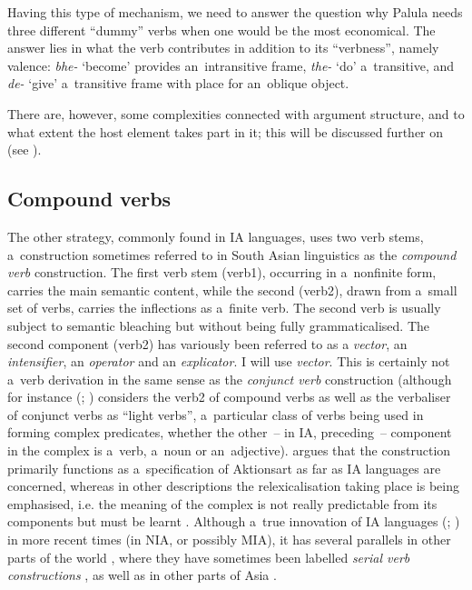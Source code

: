 Having this type of mechanism, we need to answer the question why Palula needs three different ``dummy'' verbs when one would be the most economical. The answer lies in what the verb contributes in addition to its ``verbness'', namely valence: \textit{bhe-} `become' provides an~intransitive frame, \textit{the-} `do' a~transitive, and \textit{de-} `give' a~transitive frame with place for an~oblique object. 


There are, however, some complexities connected with argument structure, and to what extent the host element takes part in it; this will be discussed further on (see ).


\subsection{Compound verbs}
\label{subsec:8-6-2}

The other strategy, commonly found in IA languages, uses two verb stems, a~construction sometimes referred to in South Asian linguistics \citep[326]{masica1991} as the \textit{compound verb} construction. The first verb stem (verb\textsc{1}), occurring in a~nonfinite form, carries the main semantic content, while the second (verb\textsc{2}), drawn from a~small set of verbs, carries the inflections as a~finite verb. The second verb is usually subject to semantic bleaching but without being fully grammaticalised. The second component (verb2) has variously been referred to as a \textit{vector}, an \textit{intensifier}, an \textit{operator} and an \textit{explicator}. I will use \textit{vector}. This is certainly not a~verb derivation in the same sense as the \textit{conjunct verb} construction (although for instance \citeauthor{butt1993} (\citeyear[31]{butt1993}; \citeyear{butt2003}) considers the verb2 of compound verbs as well as the verbaliser of conjunct verbs as ``light verbs'', a~particular class of verbs being used in forming complex predicates, whether the other~-- in IA, preceding~-- component in the complex is a~verb, a~noun or an~adjective). \citet[326--330]{masica1991} argues that the construction primarily functions as a~specification of Aktionsart as far as IA languages are concerned, whereas in other descriptions the relexicalisation taking place is being emphasised, i.e. the meaning of the complex is not really predictable from its components but must be learnt \citep[143]{schmidt1999}. Although a~true innovation of IA languages (\citealt[326]{masica1991}; \citealt{hook1977}) in more recent times (in NIA, or possibly MIA), it has several parallels in other parts of the world \citep[348--349]{hook1977}, where they have sometimes been labelled \textit{serial verb constructions} \citep{ansaldo2006}, as well as in other parts of Asia \citep[559]{ebert2006}. 



